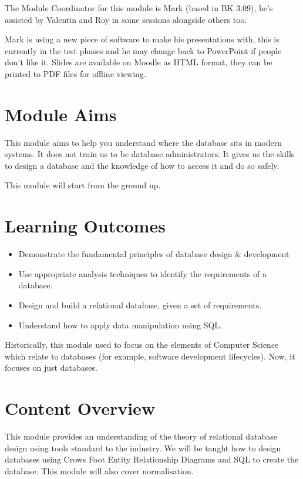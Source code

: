 
The Module Coordinator for this module is Mark (based in BK 3.09), he's assisted by Valentin and Roy in some sessions alongside others too.

Mark is using a new piece of software to make his presentations with, this is currently in the test phases and he may change back to PowerPoint if people don't like it. Slides are available on Moodle as HTML format, they can be printed to PDF files for offline viewing.

\section*{Module Aims}
This module aims to help you understand where the database sits in modern systems. It does not train us to be database administrators. It gives us the skills to design a database and the knowledge of how to access it and do so safely.

This module will start from the ground up.

\section*{Learning Outcomes}
\begin{itemize}
    \item Demonstrate the fundamental principles of database design \& development
    \item Use appropriate analysis techniques to identify the requirements of a database.
    \item Design and build a relational database, given a set of requirements.
    \item Understand how to apply data manipulation using SQL.
\end{itemize}
Historically, this module used to focus on the elements of Computer Science which relate to databases (for example, software development lifecycles). Now, it focuses on just databases.
\section*{Content Overview}
This module provides an understanding of the theory of relational database design using tools standard to the industry. We will be taught how to design databases using Crows Foot Entity Relationship Diagrams and SQL to create the database. This module will also cover normalisation.

